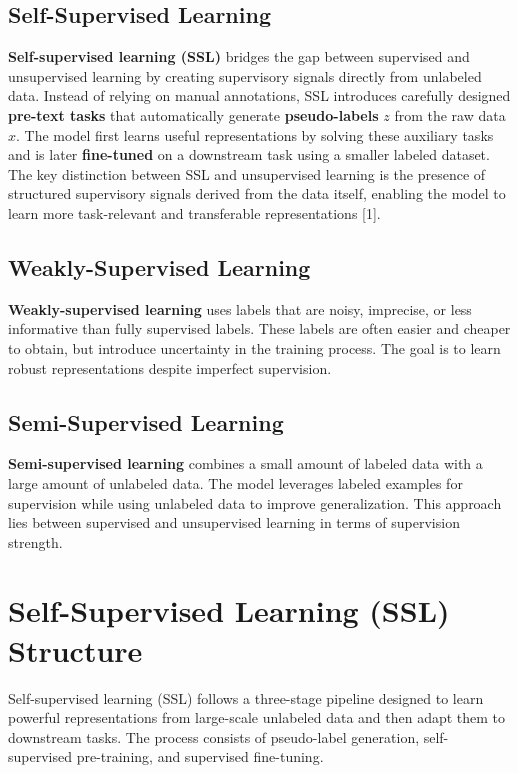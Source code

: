 \documentclass{article}
\renewcommand{\cite}[1]{[#1]}
\begin{document}
\subsection*{Self-Supervised Learning}

\textbf{Self-supervised learning (SSL)} bridges the gap between supervised and unsupervised learning by creating supervisory signals directly from unlabeled data. Instead of relying on manual annotations, SSL introduces carefully designed \textbf{pre-text tasks} that automatically generate \textbf{pseudo-labels} $z$ from the raw data $x$. The model first learns useful representations by solving these auxiliary tasks and is later \textbf{fine-tuned} on a downstream task using a smaller labeled dataset. The key distinction between SSL and unsupervised learning is the presence of structured supervisory signals derived from the data itself, enabling the model to learn more task-relevant and transferable representations \cite{1}.

\subsection*{Weakly-Supervised Learning}

\textbf{Weakly-supervised learning} uses labels that are noisy, imprecise, or less informative than fully supervised labels. These labels are often easier and cheaper to obtain, but introduce uncertainty in the training process. The goal is to learn robust representations despite imperfect supervision.

\subsection*{Semi-Supervised Learning}

\textbf{Semi-supervised learning} combines a small amount of labeled data with a large amount of unlabeled data. The model leverages labeled examples for supervision while using unlabeled data to improve generalization. This approach lies between supervised and unsupervised learning in terms of supervision strength.

\section{Self-Supervised Learning (SSL) Structure}

Self-supervised learning (SSL) follows a three-stage pipeline designed to learn powerful representations from large-scale unlabeled data and then adapt them to downstream tasks. The process consists of pseudo-label generation, self-supervised pre-training, and supervised fine-tuning.
\end{document}
